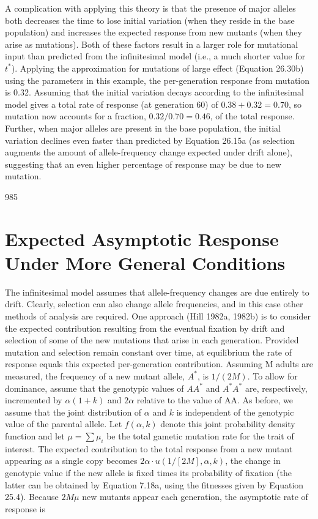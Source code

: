 \documentclass{article}
\begin{document}
{A complication with applying this theory is that the presence of major alleles both decreases the time to lose initial variation (when they reside in the base population) and increases the expected response from new mutants (when they arise as mutations). Both of these factors result in a larger role for mutational input than predicted from the infinitesimal model (i.e., a much shorter value for  $ t^{*} $). Applying the approximation for mutations of large effect (Equation 26.30b) using the parameters in this example, the per-generation response from mutation is 0.32. Assuming that the initial variation decays according to the infinitesimal model gives a total rate of response (at generation 60) of  $ 0.38 + 0.32 = 0.70 $, so mutation now accounts for a fraction,  $ 0.32 / 0.70 = 0.46 $, of the total response. Further, when major alleles are present in the base population, the initial variation declines even faster than predicted by Equation 26.15a (as selection augments the amount of allele-frequency change expected under drift alone), suggesting that an even higher percentage of response may be due to new mutation.

985

\section{Expected Asymptotic Response Under More General Conditions}
The infinitesimal model assumes that allele-frequency changes are due entirely to drift. Clearly, selection can also change allele frequencies, and in this case other methods of analysis are required. One approach (Hill 1982a, 1982b) is to consider the expected contribution resulting from the eventual fixation by drift and selection of some of the new mutations that arise in each generation. Provided mutation and selection remain constant over time, at equilibrium the rate of response equals this expected per-generation contribution. Assuming M adults are measured, the frequency of a new mutant allele,  $ A^* $, is  $ 1/(2M) $. To allow for dominance, assume that the genotypic values of  $ AA^* $ and  $ A^*A^* $ are, respectively, incremented by  $ \alpha(1+k) $ and  $ 2\alpha $ relative to the value of AA. As before, we assume that the joint distribution of  $ \alpha $ and  $ k $ is independent of the genotypic value of the parental allele. Let  $ f(\alpha, k) $ denote this joint probability density function and let  $ \mu = \sum \mu_i $ be the total gametic mutation rate for the trait of interest. The expected contribution to the total response from a new mutant appearing as a single copy becomes  $ 2\alpha \cdot u(1/[2M], \alpha, k) $, the change in genotypic value if the new allele is fixed times its probability of fixation (the latter can be obtained by Equation 7.18a, using the fitnesses given by Equation 25.4). Because  $ 2M\mu $ new mutants appear each generation, the asymptotic rate of response is

}
\end{document}
